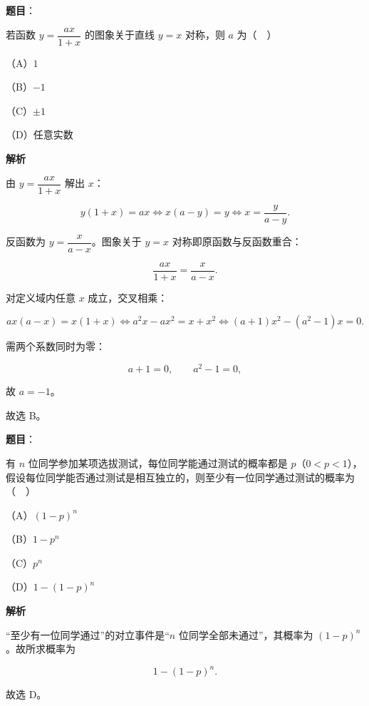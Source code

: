 \begin{answer}

\textbf{题目}：

若函数 $y=\dfrac{ax}{1+x}$ 的图象关于直线 $y=x$ 对称，则 $a$ 为（　）

（A）$1$

（B）$-1$

（C）$\pm1$

（D）任意实数

\textbf{解析}

由 $y=\dfrac{ax}{1+x}$ 解出 $x$：

\nopagebreak[4]
\[y(1+x)=ax\iff x(a-y)=y\iff x=\frac{y}{a-y}.\]

反函数为 $y=\dfrac{x}{a-x}$。图象关于 $y=x$ 对称即原函数与反函数重合：

\nopagebreak[4]
\[\frac{ax}{1+x}=\frac{x}{a-x}.\]

对定义域内任意 $x$ 成立，交叉相乘：

\nopagebreak[4]
\[ax(a-x)=x(1+x)
\iff a^2x-ax^2=x+x^2
\iff (a+1)x^2-(a^2-1)x=0.\]

需两个系数同时为零：

\nopagebreak[4]
\[a+1=0,\qquad a^2-1=0,\]

故 $a=-1$。

故选 B。


\end{answer}
\begin{answer}

\textbf{题目}：

有 $n$ 位同学参加某项选拔测试，每位同学能通过测试的概率都是 $p$（$0<p<1$），假设每位同学能否通过测试是相互独立的，则至少有一位同学通过测试的概率为（　）

（A）$(1-p)^n$

（B）$1-p^n$

（C）$p^n$

（D）$1-(1-p)^n$

\textbf{解析}

“至少有一位同学通过”的对立事件是“$n$ 位同学全部未通过”，其概率为 $(1-p)^n$。故所求概率为

\nopagebreak[4]
\[1-(1-p)^n.\]

故选 D。


\end{answer}
